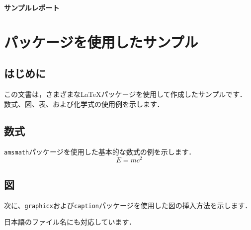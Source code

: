 \documentclass[11pt]{jsarticle}
\begin{document}
\begin{flushleft}   %
  \textbf{サンプルレポート}\\
\end{flushleft}

\section{パッケージを使用したサンプル}
\subsection{はじめに}  %
この文書は，さまざまな{\LaTeX}パッケージを使用して作成したサンプルです．
数式、図、表、および化学式の使用例を示します．

\subsection{数式}  %

\texttt{amsmath}パッケージを使用した基本的な数式の例を示します．
\begin{equation}
  E = mc^2
\end{equation}

\subsection{図} %
次に、\texttt{graphicx}および\texttt{caption}パッケージを使用した図の挿入方法を示します．

日本語のファイル名にも対応しています．
\end{document}
